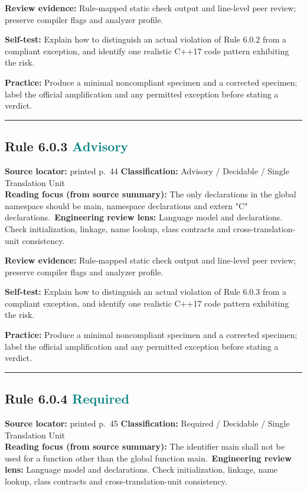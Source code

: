 \documentclass[10pt,letterpaper]{article}
\begin{document}
\textbf{Review evidence:} Rule-mapped static check output and line-level peer review; preserve compiler flags and analyzer profile.

\textbf{Self-test:} Explain how to distinguish an actual violation of Rule 6.0.2 from a compliant exception, and identify one realistic C++17 code pattern exhibiting the risk.\par
\textbf{Practice:} Produce a minimal noncompliant specimen and a corrected specimen; label the official amplification and any permitted exception before stating a verdict.
\smallskip\hrule\smallskip
\subsection*{Rule 6.0.3 \enspace \texorpdfstring{\small\textcolor{teal}{Advisory}}{Advisory}}
\noindent\textbf{Source locator:} printed p.~44 \quad\textbf{Classification:} Advisory / Decidable / Single Translation Unit\\
\textbf{Reading focus (from source summary):} The only declarations in the global namespace should be main, namespace declarations and extern "C" declarations.\
\textbf{Engineering review lens:} Language model and declarations. Check initialization, linkage, name lookup, class contracts and cross-translation-unit consistency.

\textbf{Review evidence:} Rule-mapped static check output and line-level peer review; preserve compiler flags and analyzer profile.

\textbf{Self-test:} Explain how to distinguish an actual violation of Rule 6.0.3 from a compliant exception, and identify one realistic C++17 code pattern exhibiting the risk.\par
\textbf{Practice:} Produce a minimal noncompliant specimen and a corrected specimen; label the official amplification and any permitted exception before stating a verdict.
\smallskip\hrule\smallskip
\subsection*{Rule 6.0.4 \enspace \texorpdfstring{\small\textcolor{teal}{Required}}{Required}}
\noindent\textbf{Source locator:} printed p.~45 \quad\textbf{Classification:} Required / Decidable / Single Translation Unit\\
\textbf{Reading focus (from source summary):} The identifier main shall not be used for a function other than the global function main.\
\textbf{Engineering review lens:} Language model and declarations. Check initialization, linkage, name lookup, class contracts and cross-translation-unit consistency.
\end{document}
